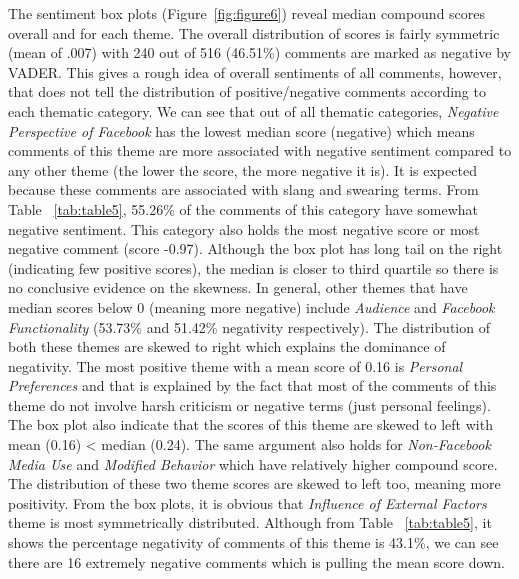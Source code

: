 The sentiment box plots (Figure~\ref{fig:figure6}) reveal median compound scores overall and for each theme. The overall distribution of scores is fairly symmetric (mean of .007) with 240 out of 516 (46.51\%) comments are marked as negative by VADER. This gives a rough idea of overall sentiments of all comments, however, that does not tell the distribution of positive/negative comments according to each thematic category. We can see that out of all thematic categories, \textit{Negative Perspective of Facebook} has the lowest median score (negative) which means comments of this theme are more associated with negative sentiment compared to any other theme (the lower the score, the more negative it is). It is expected because these comments are associated with slang and swearing terms. From Table ~\ref{tab:table5}, 55.26\% of the comments of this category have somewhat negative sentiment. This category also holds the most negative score or most negative comment (score -0.97). Although the box plot has long tail on the right (indicating few positive scores), the median is closer to third quartile so there is no conclusive evidence on the skewness.  In general, other themes that have median scores below 0 (meaning more negative) include \textit{Audience} and \textit{Facebook Functionality} (53.73\% and 51.42\% negativity respectively). The distribution of both these themes are skewed to right which explains the dominance of negativity. The most positive theme with a mean score of 0.16 is \textit{Personal Preferences} and that is explained by the fact that most of the comments of this theme do not involve harsh criticism or negative terms (just personal feelings). The box plot also indicate that the scores of this theme are skewed to left with mean (0.16) < median (0.24). The same argument also holds for \textit{Non-Facebook Media Use} and \textit{Modified Behavior} which have relatively higher compound score. The distribution of these two theme scores are skewed to left too, meaning more positivity. From the box plots, it is obvious that \textit{Influence of External Factors} theme is most symmetrically distributed. Although from Table ~\ref{tab:table5}, it shows the percentage negativity of comments of this theme is 43.1\%, we can see there are 16 extremely negative comments which is pulling the mean score down.

